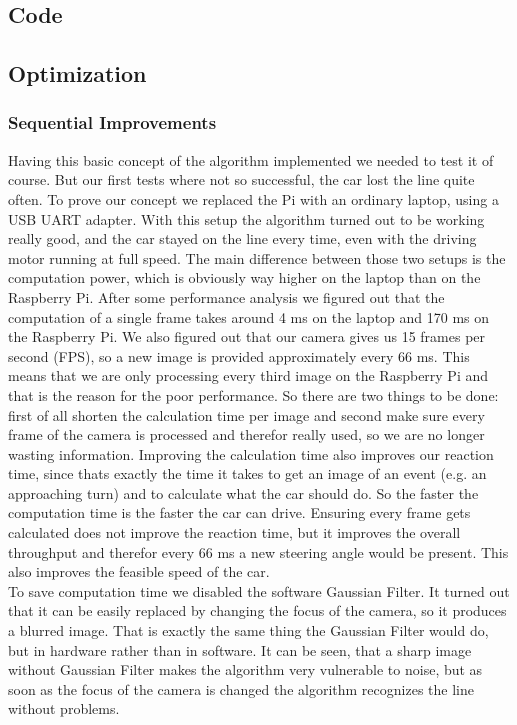 \documentclass[11pt,twocolumn]{article}
\begin{document}
\subsection{Code}
\subsection{Optimization}
\subsubsection{Sequential Improvements}
Having this basic concept of the algorithm implemented we needed to test it of course. But our first tests where not so successful, the car lost the line quite often. To prove our concept we replaced the Pi with an ordinary laptop, using a USB UART adapter. With this setup the algorithm turned out to be working really good, and the car stayed on the line every time, even with the driving motor running at full speed. The main difference between those two setups is the computation power, which is obviously way higher on the laptop than on the Raspberry Pi. After some performance analysis we figured out that the computation of a single frame takes around 4 ms on the laptop and 170 ms on the Raspberry Pi.
We also figured out that our camera gives us 15 frames per second (FPS), so a new image is provided approximately every 66 ms. This means that we are only processing every third image on the Raspberry Pi and that is the reason for the poor performance. So there are two things to be done: first of all shorten the calculation time per image and second make sure every frame of the camera is processed and therefor really used, so we are no longer wasting information. Improving the calculation time also improves our reaction time, since thats exactly the time it takes to get an image of an event (e.g. an approaching turn) and to calculate what the car should do. So the faster the computation time is the faster the car can drive. Ensuring every frame gets calculated does not improve the reaction time, but it improves the overall throughput and therefor every 66 ms a new steering angle would be present. This also improves the feasible speed of the car.\\
To save computation time we disabled the software Gaussian Filter. It turned out that it can be easily replaced by changing the focus of the camera, so it produces a blurred image. That is exactly the same thing the Gaussian Filter would do, but in hardware rather than in software. It can be seen, that a sharp image without Gaussian Filter makes the algorithm very vulnerable to noise, but as soon as the focus of the camera is changed the algorithm recognizes the line without problems. \\
\end{document}
